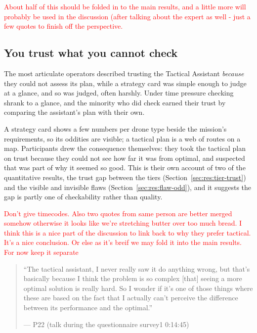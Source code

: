 
\textcolor{red}{About half of this should be folded in to the main results, and a little more will probably be used in the discussion (after talking about the expert as well - just a few quotes to finish off the perspective. }


\subsection{You trust what you cannot check}\label{sec:qual:trust-unchecked}

The most articulate operators described trusting the Tactical Assistant \emph{because} they could not assess its plan, while a strategy card was simple enough to judge at a glance, and so was judged, often harshly. Under time pressure checking shrank to a glance, and the minority who did check earned their trust by comparing the assistant's plan with their own.


\label{sec:qual:trust-unchecked:cant-check}
A strategy card shows a few numbers per drone type beside the mission's requirements, so its oddities are visible; a tactical plan is a web of routes on a map. Participants drew the consequence themselves: they took the tactical plan on trust because they could not see how far it was from optimal, and suspected that was part of why it seemed so good. This is their own account of two of the quantitative results, the trust gap between the tiers (Section~\ref{sec:res:tier-trust}) and the visible and invisible flaws (Section~\ref{sec:res:flaw-odd}), and it suggests the gap is partly one of checkability rather than quality.

\textcolor{red}{Don't give timecodes. Also two quotes from same person are better merged somehow otherwise it looks like we're stretching butter over too much bread.
I think this is a nice part of the discussion to link back to why they prefer tactical. It's a nice conclusion. Or else as it's breif we may fold it into the main results. For now keep it separate}

\begin{quote}\small
``The tactical assistant, I never really saw it do anything wrong, but that's basically because I think the problem is so complex [that] seeing a more optimal solution is really hard. So I wonder if it's one of those things where these are based on the fact that I actually can't perceive the difference between its performance and the optimal.''\par\hfill--- P22 (talk during the questionnaire survey1 0:14:45)
\end{quote}

